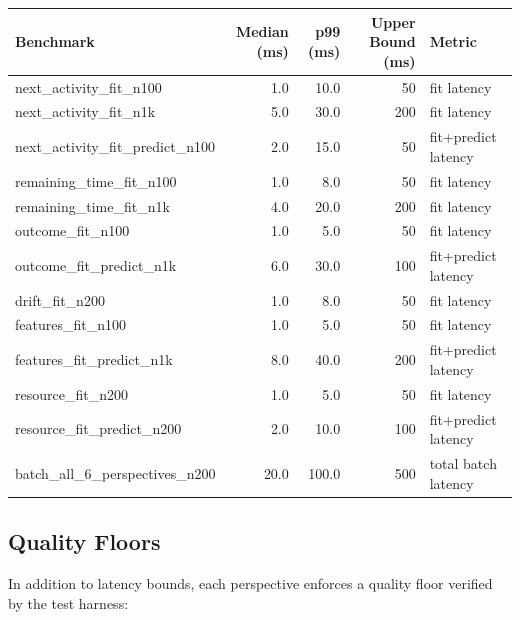 \documentclass[11pt,a4paper]{article}
\begin{document}
\begin{center}
\small
\begin{tabular}{@{}lrrrl@{}}
\toprule
\textbf{Benchmark} & \textbf{Median (ms)} & \textbf{p99 (ms)} &
\textbf{Upper Bound (ms)} & \textbf{Metric} \\
\midrule
next\_activity\_fit\_n100           & 1.0  &  10.0 &  50 & fit latency \\
next\_activity\_fit\_n1k            & 5.0  &  30.0 & 200 & fit latency \\
next\_activity\_fit\_predict\_n100  & 2.0  &  15.0 &  50 & fit+predict latency \\
remaining\_time\_fit\_n100          & 1.0  &   8.0 &  50 & fit latency \\
remaining\_time\_fit\_n1k           & 4.0  &  20.0 & 200 & fit latency \\
outcome\_fit\_n100                  & 1.0  &   5.0 &  50 & fit latency \\
outcome\_fit\_predict\_n1k          & 6.0  &  30.0 & 100 & fit+predict latency \\
drift\_fit\_n200                    & 1.0  &   8.0 &  50 & fit latency \\
features\_fit\_n100                 & 1.0  &   5.0 &  50 & fit latency \\
features\_fit\_predict\_n1k         & 8.0  &  40.0 & 200 & fit+predict latency \\
resource\_fit\_n200                 & 1.0  &   5.0 &  50 & fit latency \\
resource\_fit\_predict\_n200        & 2.0  &  10.0 & 100 & fit+predict latency \\
batch\_all\_6\_perspectives\_n200   & 20.0 & 100.0 & 500 & total batch latency \\
\bottomrule
\end{tabular}
\end{center}

\subsection{Quality Floors}

In addition to latency bounds, each perspective enforces a quality floor
verified by the test harness:
\end{document}
